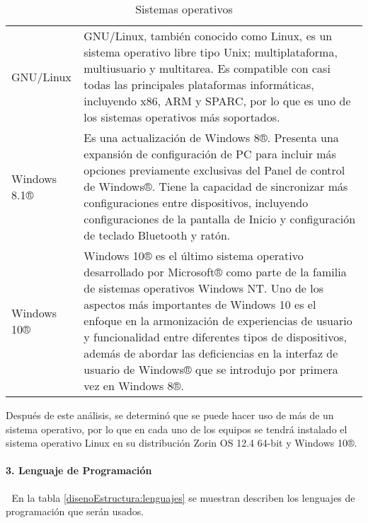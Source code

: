 \begin{table}[htbp]
	\begin{center}
		\begin{tabular}{|p{3cm}|p{10cm}|}
			\hline
			\thead{Nombre}&\thead{Descripción}\\
			\hline
			\hline
			GNU/Linux &  GNU/Linux, también conocido como Linux, es un sistema operativo libre tipo Unix; multiplataforma, multiusuario y multitarea. Es compatible con casi todas las principales plataformas informáticas, incluyendo x86, ARM y SPARC, por lo que es uno de los sistemas operativos más soportados.\\
			\hline
			Windows 8.1® & Es una actualización de Windows 8®. Presenta una expansión de configuración de PC para incluir más opciones previamente exclusivas del  Panel de control de Windows®. Tiene la capacidad de sincronizar más configuraciones entre dispositivos, incluyendo configuraciones de la pantalla de Inicio y configuración de teclado Bluetooth y ratón.\\
			\hline
			Windows 10® & Windows 10® es el último sistema operativo desarrollado por Microsoft®  como parte de la familia de sistemas operativos Windows NT. Uno de los aspectos más importantes de Windows 10 es el enfoque en la armonización de experiencias de usuario y funcionalidad entre diferentes tipos de dispositivos, además de abordar las deficiencias en la interfaz de usuario de Windows®  que se introdujo por primera vez en Windows 8®.\\
			\hline
		\end{tabular}
		\caption{Sistemas operativos}
		\label{disenoEstructura:SO}
	\end{center}
\end{table}

Después de este análisis, se determinó que se puede hacer uso de más de un sistema operativo, por lo que en cada uno de los equipos se tendrá instalado el sistema operativo Linux en su distribución Zorin OS 12.4 64-bit y Windows 10®.

\paragraph{3. Lenguaje de Programación} \textcolor{White}{.} \newline
En la tabla \ref{disenoEstructura:lenguajes} se muestran describen los lenguajes de programación que serán usados.\\


